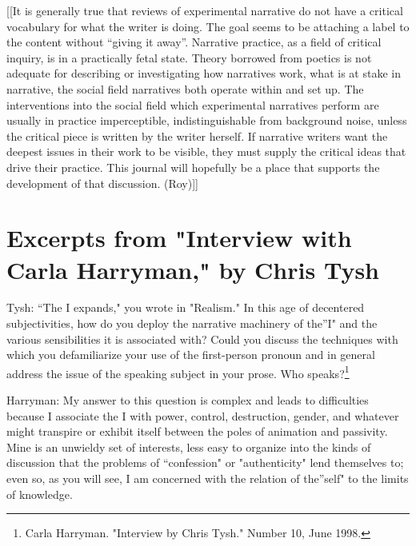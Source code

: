 \documentclass[
]{memoir}
\begin{document}
{[}{[}It is generally true that reviews of experimental narrative do not
have a critical vocabulary for what the writer is doing. The goal seems
to be attaching a label to the content without ``giving it away''.
Narrative practice, as a field of critical inquiry, is in a practically
fetal state. Theory borrowed from poetics is not adequate for describing
or investigating how narratives work, what is at stake in narrative, the
social field narratives both operate within and set up. The
interventions into the social field which experimental narratives
perform are usually in practice imperceptible, indistinguishable from
background noise, unless the critical piece is written by the writer
herself. If narrative writers want the deepest issues in their work to
be visible, they must supply the critical ideas that drive their
practice. This journal will hopefully be a place that supports the
development of that discussion. (Roy){]}{]}

\hypertarget{excerpts-from-interview-with-carla-harryman-by-chris-tysh}{%
\section*{Excerpts from "Interview with Carla Harryman," by Chris
Tysh}\label{excerpts-from-interview-with-carla-harryman-by-chris-tysh}}

Tysh: ``The I expands," you wrote in "Realism." In this age of
decentered subjectivities, how do you deploy the narrative machinery of
the''I" and the various sensibilities it is associated with? Could you
discuss the techniques with which you defamiliarize your use of the
first-person pronoun and in general address the issue of the speaking
subject in your prose. Who speaks?\footnote{Carla Harryman. "Interview
  by Chris Tysh." Number 10, June 1998.}

Harryman: My answer to this question is complex and leads to
difficulties because I associate the I with power, control, destruction,
gender, and whatever might transpire or exhibit itself between the poles
of animation and passivity. Mine is an unwieldy set of interests, less
easy to organize into the kinds of discussion that the problems of
``confession" or "authenticity" lend themselves to; even so, as you will
see, I am concerned with the relation of the''self" to the limits of
knowledge.
\end{document}
